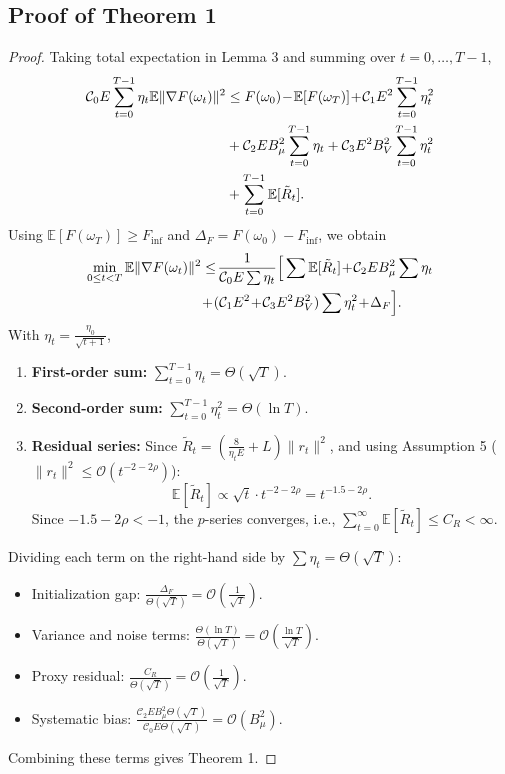 \subsection{Proof of Theorem 1}
\begin{proof}
Taking total expectation in Lemma 3 and summing over $t=0,\dots,T-1$,
\begin{align}
\mathcal{C}_0 E \sum_{t=0}^{T-1} \eta_t \mathbb{E}\|\nabla F(\omega_t)\|^2
&\le F(\omega_0) \!- \!\mathbb{E}[F(\omega_T)] \!+ \!\mathcal{C}_1 E^2 \sum_{t=0}^{T-1} \eta_t^2 \notag \\
& + \mathcal{C}_2 E B_\mu^2 \sum_{t=0}^{T-1} \eta_t + \mathcal{C}_3 E^2 B_V^2 \sum_{t=0}^{T-1} \eta_t^2 \notag \\
& + \sum_{t=0}^{T-1} \mathbb{E}[\tilde{R}_t].
\end{align}
Using $\mathbb{E}[F(\omega_T)] \ge F_{\inf}$ and $\Delta_F = F(\omega_0)-F_{\inf}$, we obtain
\begin{align}
\min_{0 \le t < T} \mathbb{E}\|\nabla F(\omega_t)\|^2
&\le \!\frac{1}{\mathcal{C}_0 E \sum \eta_t}
\Big[\sum \mathbb{E}[\tilde{R}_t]\! + \!\mathcal{C}_2 E B_\mu^2 \sum \eta_t  \notag \\
&\!+\! (\mathcal{C}_1 E^2 \!+\! \mathcal{C}_3 E^2 B_V^2)\sum \eta_t^2\!+\! \Delta_F\Big].
\end{align}
With $\eta_t = \frac{\eta_0}{\sqrt{t+1}}$,
\begin{enumerate}
\item \textbf{First-order sum:} $\sum_{t=0}^{T-1} \eta_t = \Theta(\sqrt{T})$.
\item \textbf{Second-order sum:} $\sum_{t=0}^{T-1} \eta_t^2 = \Theta(\ln T)$.
\item \textbf{Residual series:} Since $\tilde{R}_t = \left(\frac{8}{\eta_t E} + L\right)\|r_t\|^2$, and using Assumption 5 ($\|r_t\|^2 \le \mathcal{O}(t^{-2-2\rho})$):
\begin{equation}
\mathbb{E}[\tilde{R}_t] \propto \sqrt{t} \cdot t^{-2-2\rho} = t^{-1.5-2\rho}.
\end{equation}
Since $-1.5-2\rho<-1$, the $p$-series converges, i.e., $\sum_{t=0}^\infty \mathbb{E}[\tilde{R}_t] \le C_R < \infty$.
\end{enumerate}

Dividing each term on the right-hand side by $\sum \eta_t = \Theta(\sqrt{T})$:
\begin{itemize}
\item Initialization gap: $\frac{\Delta_F}{\Theta(\sqrt{T})} = \mathcal{O}\left(\frac{1}{\sqrt{T}}\right)$.
\item Variance and noise terms: $\frac{\Theta(\ln T)}{\Theta(\sqrt{T})} = \mathcal{O}\left(\frac{\ln T}{\sqrt{T}}\right)$.
\item Proxy residual: $\frac{C_R}{\Theta(\sqrt{T})} = \mathcal{O}\left(\frac{1}{\sqrt{T}}\right)$.
\item Systematic bias: $\frac{\mathcal{C}_2 E B_\mu^2 \Theta(\sqrt{T})}{\mathcal{C}_0 E \Theta(\sqrt{T})} = \mathcal{O}(B_\mu^2)$.
\end{itemize}

Combining these terms gives Theorem 1.
\end{proof}
